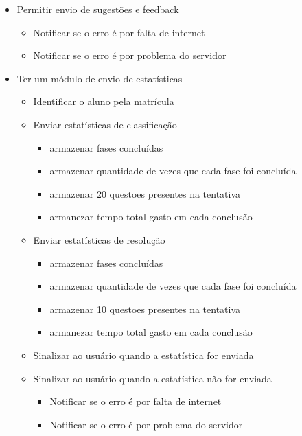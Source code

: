 \begin{itemize}
	\item Permitir envio de sugestões e feedback
		\begin{itemize}
			\item Notificar se o erro é por falta de internet
			\item Notificar se o erro é por problema do servidor			
		\end{itemize}

	\item Ter um módulo de envio de estatísticas
		\begin{itemize}
			\item Identificar o aluno pela matrícula
			\item Enviar estatísticas de classificação
				\begin{itemize}
					\item armazenar fases concluídas
					\item armazenar quantidade de vezes que cada fase foi concluída
					\item armazenar 20 questoes presentes na tentativa
					\item armanezar tempo total gasto em cada conclusão
				\end{itemize}
			\item Enviar estatísticas de resolução
				\begin{itemize}
					\item armazenar fases concluídas
					\item armazenar quantidade de vezes que cada fase foi concluída
					\item armazenar 10 questoes presentes na tentativa
					\item armanezar tempo total gasto em cada conclusão
				\end{itemize}
			\item Sinalizar ao usuário quando a estatística for enviada
			\item Sinalizar ao usuário quando a estatística não for enviada
				\begin{itemize}
					\item Notificar se o erro é por falta de internet
					\item Notificar se o erro é por problema do servidor
				\end{itemize}
		\end{itemize}
\end{itemize}

